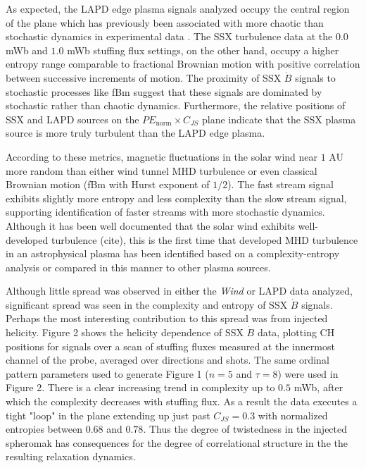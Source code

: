 \documentclass[aps,pre,twocolumn,secnumarabic,nobalancelastpage,amsmath,amssymb,
nofootinbib]{revtex4-1}
\begin{document}
As expected, the LAPD edge plasma signals analyzed occupy the central region of the plane which has previously been associated with more chaotic than stochastic dynamics in experimental data \cite{maggs2013, gekelman2014}. The SSX turbulence data at the $0.0$ mWb and $1.0$ mWb stuffing flux settings, on the other hand, occupy a higher entropy range comparable to fractional Brownian motion with positive correlation between successive increments of motion. The proximity of SSX $\dot{B}$ signals to stochastic processes like fBm suggest that these signals are dominated by stochastic rather than chaotic dynamics. Furthermore, the relative  positions of SSX and LAPD sources on the $PE_{\text{norm}} \times C_{JS}$ plane indicate that the SSX plasma source is more truly turbulent than the LAPD edge plasma. 

According to these metrics, magnetic fluctuations in the solar wind near $1$ AU more random than either wind tunnel MHD turbulence or even classical Brownian motion (fBm with Hurst exponent of $1/2$).  The fast stream signal exhibits slightly more entropy and less complexity than the slow stream signal, supporting identification of faster streams with more stochastic dynamics.  Although it has been well documented that the solar wind exhibits well-developed turbulence (cite), this is the first time that developed MHD turbulence in an astrophysical plasma has been identified based on a complexity-entropy analysis or compared in this manner to other plasma sources.

Although little spread was observed in either the \textit{Wind} or LAPD data analyzed, significant spread was seen in the complexity and entropy of SSX $\dot{B}$ signals. Perhaps the most interesting contribution to this spread was from injected helicity.  Figure 2 shows the helicity dependence of SSX $\dot{B}$ data, plotting CH positions for signals over a scan of stuffing fluxes measured at the innermost channel of the probe, averaged over directions and shots. The same ordinal pattern parameters used to generate Figure 1 ($n=5$ and $\tau=8$) were used in Figure 2. There is a clear increasing trend in complexity up to $0.5$ mWb, after which the complexity decreases with stuffing flux. As a result the data executes a tight "loop" in the plane extending up just past $C_{JS}=0.3$ with normalized entropies between $0.68$ and $0.78$. Thus the degree of twistedness in the injected spheromak has consequences for the degree of correlational structure in the the resulting relaxation dynamics.
\end{document}
